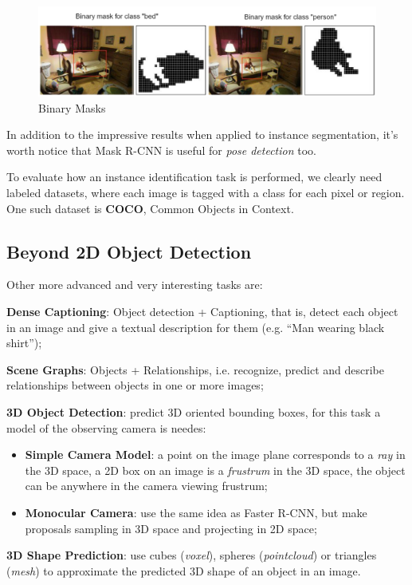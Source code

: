 \begin{figure}[h!]
    \centering
    \includegraphics[width=\linewidth]{images/mask-rcnn-2}
    \caption[Binary Masks]{Binary Masks}
    \label{fig:mask-rcnn-masks}
\end{figure}

In addition to the impressive results when applied to instance segmentation, it's worth notice that Mask R-CNN is useful for \textit{pose detection} too.

To evaluate how an instance identification task is performed, we clearly need labeled datasets, where each image is tagged with a class for each pixel or region. One such dataset is \textbf{COCO}, Common Objects in Context.


\subsection{Beyond 2D Object Detection}\label{sec:ds-beyond}

Other more advanced and very interesting tasks are:
\begin{myitem}
    \item \textbf{Dense Captioning}: Object detection + Captioning, that is, detect each object in an image and give a textual description for them (e.g. ``Man wearing black shirt'');
    \item \textbf{Scene Graphs}: Objects + Relationships, i.e. recognize, predict and describe relationships between objects in one or more images;
    \item \textbf{3D Object Detection}: predict 3D oriented bounding boxes, for this task a model of the observing camera is needes:
    \begin{itemize}
        \item \textbf{Simple Camera Model}: a point on the image plane corresponds to a \textit{ray} in the 3D space, a 2D box on an image is a \textit{frustrum} in the 3D space, the object can be anywhere in the camera viewing frustrum;
        \item \textbf{Monocular Camera}: use the same idea as Faster R-CNN, but make proposals sampling in 3D space and projecting in 2D space;
    \end{itemize}
    \item \textbf{3D Shape Prediction}: use cubes (\textit{voxel}), spheres (\textit{pointcloud}) or triangles (\textit{mesh}) to approximate the predicted 3D shape of an object in an image.
\end{myitem}

